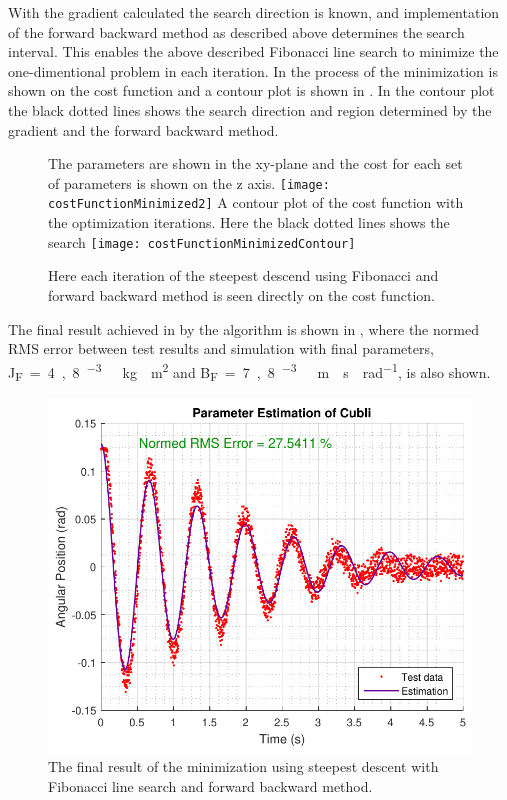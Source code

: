 With the gradient calculated the search direction is known, and implementation of the forward backward method as described above determines the search interval. This enables the above described Fibonacci line search to minimize the one-dimentional problem in each iteration. In  the process of the minimization is shown on the cost function and a contour plot is shown in . In the contour plot the black dotted lines shows the search direction and region determined by the gradient and the forward backward method.

\begin{figure}[H]
  \begin{minipage}{\linewidth}
    \captionsetup[subfigure]{font = footnotesize}
    \centering
    \subcaptionbox
    {
      The parameters are shown in the xy-plane and the cost for each set of parameters is shown on the z axis.
      \label{CostFunctionMinimized3D}
    }
    {
      \texttt{[image: costFunctionMinimized2]}
    }\quad
    \subcaptionbox
    {
      A contour plot of the cost function with the optimization iterations. Here the black dotted lines shows the search 
      \label{CostFunctionMinimizedContour}
    }
    {
      \texttt{[image: costFunctionMinimizedContour]}
    }
    \caption{Here each iteration of the steepest descend using Fibonacci and forward backward method is seen directly on the cost function.}
    \label{CostFunctionMinimized}
  \end{minipage}
\end{figure}
%
The final result achieved in by the algorithm is shown in , where the normed RMS error between test results and simulation with final parameters, \si{J_F=4,8 ^{-3}\ kg \cdot m^2} and \si{B_F=7,8 ^{-3}\ m \cdot s \cdot rad^{-1}}, is also shown.
%
\begin{figure}[H] 
	\centering
	\includegraphics[width=.65\textwidth]{figures/resultOfGradientWithFibonacciAndForwardBackward}
	\caption{The final result of the minimization using steepest descent with Fibonacci line search and forward backward method.}
	\label{resultOfGradientWithFibonacciAndForwardBackward}
\end{figure}